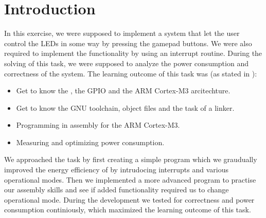 \section{Introduction}
In this exercise, we were supposed to implement a system that let the user control the LEDs in some way by pressing the gamepad buttons. We were also required to implement the functionality by using an interrupt routine. During the solving of this task, we were supposed to analyze the power consumption and correctness of the system. The learning outcome of this task was (as stated in \cite[p. 19]{compendium}):
\begin{itemize}
	\item Get to know the \boardName, the GPIO and the ARM Cortex-M3 arcitechture.
	\item Get to know the GNU toolchain, object files and the task of a linker.
	\item Programming in assembly for the ARM Cortex-M3.
	\item Measuring and optimizing power consumption.
\end{itemize}
We approached the task by first creating a simple program which we graudually improved the energy efficiency of by intrudocing interrupts and various operational modes. Then we implemented a more advanced program to practise our assembly skills and see if added functionality required us to change operational mode. During the development we tested for correctness and power consumption continiously, which maximized the learning outcome of this task.

